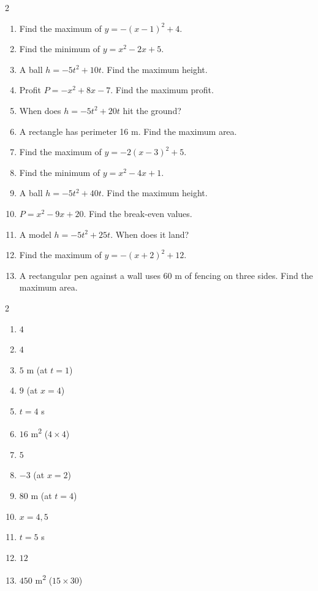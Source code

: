\documentclass[11pt]{article}
\begin{document}
\begin{recapbox}
\begin{multicols}{2}
\small
\begin{enumerate}[leftmargin=*,itemsep=3pt]
  \item Find the maximum of $y=-(x-1)^2+4$.
  \item Find the minimum of $y=x^2-2x+5$.
  \item A ball $h=-5t^2+10t$. Find the maximum height.
  \item Profit $P=-x^2+8x-7$. Find the maximum profit.
  \item When does $h=-5t^2+20t$ hit the ground?
  \item A rectangle has perimeter 16 m. Find the maximum area.
  \item Find the maximum of $y=-2(x-3)^2+5$.
  \item Find the minimum of $y=x^2-4x+1$.
  \item A ball $h=-5t^2+40t$. Find the maximum height.
  \item $P=x^2-9x+20$. Find the break-even values.
  \item A model $h=-5t^2+25t$. When does it land?
  \item Find the maximum of $y=-(x+2)^2+12$.
  \item A rectangular pen against a wall uses 60 m of fencing on three sides. Find the maximum area.
\end{enumerate}
\end{multicols}
\end{recapbox}

\begin{keybox}
\begin{multicols}{2}
\small
\begin{enumerate}[leftmargin=*,itemsep=3pt]
  \item $4$
  \item $4$
  \item $5$ m (at $t=1$)
  \item $9$ (at $x=4$)
  \item $t=4$ s
  \item $16$ m\textsuperscript{2} ($4\times4$)
  \item $5$
  \item $-3$ (at $x=2$)
  \item $80$ m (at $t=4$)
  \item $x=4,5$
  \item $t=5$ s
  \item $12$
  \item $450$ m\textsuperscript{2} ($15\times30$)
\end{enumerate}
\end{multicols}
\end{keybox}
\end{document}
